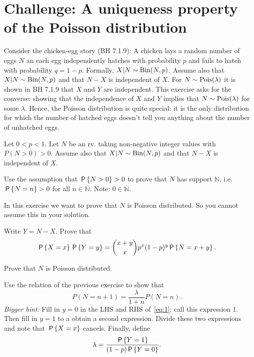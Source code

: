 \section{Challenge: A uniqueness property of the Poisson distribution}

Consider  the chicken-egg story (BH 7.1.9): A chicken lays a random number of eggs $N$ an each egg independently hatches with probability $p$ and fails to hatch with probability $q = 1-p$.
Formally, $X|N\sim\Bin{N,p}$.
Assume also that $X|N\sim\Bin{N,p}$ and that $N-X$ is independent of $X$.
For $N \sim \Pois{\lambda}$ it is shown in BH 7.1.9 that $X$ and $Y$ are independent.
This exercise asks for the converse: showing that the independence of $X$ and $Y$ implies that $N \sim \Pois{\lambda}$ for some $\lambda$.
Hence, the Poisson distribution is quite special: it is the only distribution for which the number of hatched eggs doesn't tell you anything about the number of unhatched eggs.

Let $0 < p < 1$. Let $N$ be an rv. taking non-negative integer values with $P(N > 0) > 0$.
Assume also that  $X|N\sim\Bin{N,p}$ and that $N-X$ is independent of $X$.

\begin{exercise}
 Use the assumption that $\P{N>0}>0$ to prove that $N$ has support $\mathbb N$, i.e. $\P{N=n} > 0$ for all $n \in \mathbb N$. Note: $0 \in \mathbb N$.
\begin{hint}
In this exercise we want to prove that $N$ is Poisson distributed. So you cannot assume this in your solution.
\end{hint}
\end{exercise}



\begin{exercise}
Write $Y = N-X$. Prove that
\begin{equation}
\label{eq:1}
\P{X=x}\P{Y=y} = {x+y \choose x} p^x (1-p)^y \P{N=x+y}.
\end{equation}
\end{exercise}



\begin{exercise}
Prove that $N$ is Poisson distributed.
\begin{hint}
Use the relation of the previous exercise to show that
\begin{equation}
  \label{eq:3}
P(N=n+1) = \frac{\lambda}{1+n} P(N=n).
\end{equation}
\textit{Bigger hint:} Fill in $y=0$ in the LHS and RHS of~\cref{eq:1}; call this expression 1. Then fill in $y=1$ to a obtain a second expression. Divide these two expressions and note that $\P{X=x}$ cancels. Finally,  define
\begin{equation}
\label{eq:2}
\lambda = \frac{\P{Y=1}}{(1-p)\P{Y=0}}.
\end{equation}
\end{hint}
\end{exercise}


